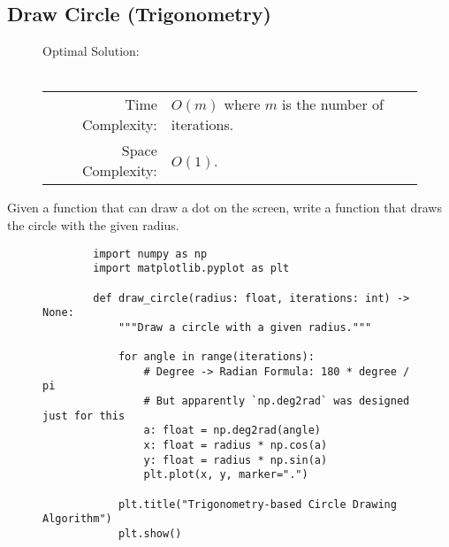 
\subsection{Draw Circle (Trigonometry)}

\begin{figure}[H]
    Optimal Solution:\\\\
    \begin{tabular}{rl}
        Time Complexity:& \(O(m)\) where \(m\) is the number of iterations.\\
        Space Complexity:& \(O(1)\).
    \end{tabular}
\end{figure}

Given a function that can draw a dot on the screen, write a function that draws
the circle with the given radius.

\begin{figure}[H]
    \centering
    \begin{verbatim}
        import numpy as np
        import matplotlib.pyplot as plt

        def draw_circle(radius: float, iterations: int) -> None:
            """Draw a circle with a given radius."""

            for angle in range(iterations):
                # Degree -> Radian Formula: 180 * degree / pi
                # But apparently `np.deg2rad` was designed just for this
                a: float = np.deg2rad(angle)
                x: float = radius * np.cos(a)
                y: float = radius * np.sin(a)
                plt.plot(x, y, marker=".")

            plt.title("Trigonometry-based Circle Drawing Algorithm")
            plt.show()
    \end{verbatim}
\end{figure}
